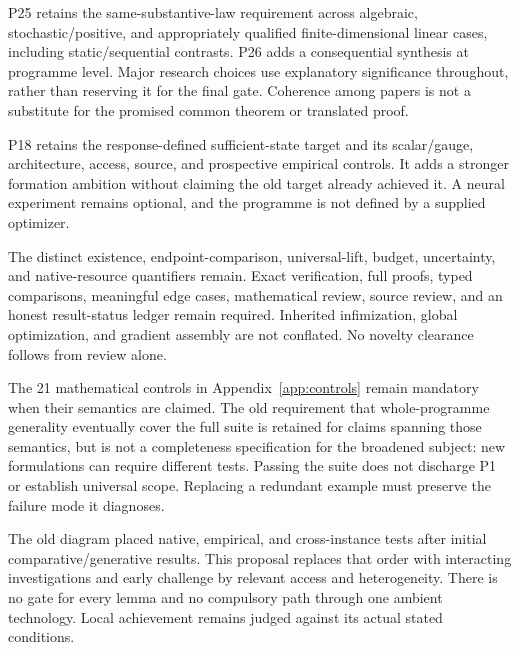 \documentclass[11pt]{article}
\theoremstyle{definition}
\begin{document}
\begin{description}[style=nextline,leftmargin=0pt]
\item[Gate F and generality \quad carried and assessed throughout]
P25 retains the same-substantive-law requirement across algebraic, stochastic/positive, and appropriately qualified finite-dimensional linear cases, including static/sequential contrasts. P26 adds a consequential synthesis at programme level. Major research choices use explanatory significance throughout, rather than reserving it for the final gate. Coherence among papers is not a substitute for the promised common theorem or translated proof.

\item[Learning \quad retained as a candidate and strengthened]
P18 retains the response-defined sufficient-state target and its scalar/gauge, architecture, access, source, and prospective empirical controls. It adds a stronger formation ambition without claiming the old target already achieved it. A neural experiment remains optional, and the programme is not defined by a supplied optimizer.

\item[Resources and proof discipline \quad carried]
The distinct existence, endpoint-comparison, universal-lift, budget, uncertainty, and native-resource quantifiers remain. Exact verification, full proofs, typed comparisons, meaningful edge cases, mathematical review, source review, and an honest result-status ledger remain required. Inherited infimization, global optimization, and gradient assembly are not conflated. No novelty clearance follows from review alone.

\item[Stress tests \quad content carried, completeness role revised]
The 21 mathematical controls in Appendix~\ref{app:controls} remain mandatory when their semantics are claimed. The old requirement that whole-programme generality eventually cover the full suite is retained for claims spanning those semantics, but is not a completeness specification for the broadened subject: new formulations can require different tests. Passing the suite does not discharge P1 or establish universal scope. Replacing a redundant example must preserve the failure mode it diagnoses.

\item[Research order \quad revised]
The old diagram placed native, empirical, and cross-instance tests after initial comparative/generative results. This proposal replaces that order with interacting investigations and early challenge by relevant access and heterogeneity. There is no gate for every lemma and no compulsory path through one ambient technology. Local achievement remains judged against its actual stated conditions.
\end{description}
\end{document}
